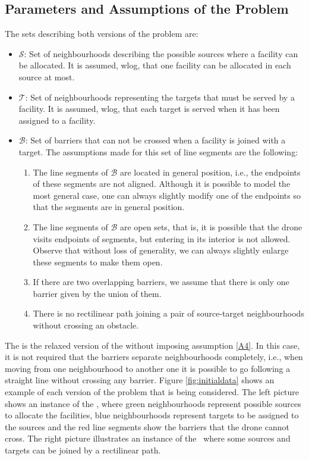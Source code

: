 \documentclass[a4paper,  review, authoryear, 1p.]{elsarticle}
\newcommand{\KMPN}{{\sf{H-KMPN}}}
\newcommand{\KMPVN}{{\sf{H-KMPVN}\xspace }}
\begin{document}
	\subsection{Parameters and Assumptions of the Problem}
	The sets describing both versions of the problem are:
	\begin{itemize}
		\item $\mathcal S$: Set of neighbourhoods describing the possible sources where a facility can be allocated. It is assumed, wlog, that one facility can be allocated in each source at most.
		\item $\mathcal T$: Set of neighbourhoods representing the targets that must be served by a facility. It is assumed, wlog, that each target is served when it has been assigned to a facility.
		\item $\mathcal B$: Set of barriers that can not be crossed when a facility is joined with a target. The assumptions made for this set of line segments are the following:
		
		\begin{enumerate}[label=\textbf{A\arabic*},ref=\textbf{A\arabic*}]
			\item \label{A1}The line segments of $\mathcal B$ are located in general position, i.e., the endpoints of these segments are not aligned. Although it is possible to model the most general case, one can always  slightly modify one of the endpoints so that the segments are in general position.
			\item The line segments of $\mathcal B$ are open sets, that is, it is possible that the drone visits  endpoints of segments, but entering  in its interior is not allowed. Observe that without loss of generality, we can always slightly enlarge these segments to make them open.
			\item  If there are two overlapping barriers, we assume that there is only one barrier given by the union of them.
			\item \label{A4}There is no rectilinear path joining a pair of source-target neighbourhoods without crossing an obstacle.
		\end{enumerate}
		
	\end{itemize}

	The \KMPVN\xspace is the relaxed version of the \KMPN\xspace without imposing assumption \ref{A4}. In this case, it is not required that the barriers separate neighbourhoods completely, i.e., when moving from one neighbourhood to another one it is possible to go following a straight line without crossing any barrier. Figure \ref{fig:initialdata} shows an example of each version of the problem that is being considered. The left picture shows an instance of the \KMPN, where green neighbourhoods represent possible sources to allocate the facilities, blue neighbourhoods represent targets to be assigned to the sources and the red line segments show the barriers that the drone cannot cross. The right picture illustrates an instance of the \KMPVN \ where some sources and targets can be joined by a rectilinear path.
	
\end{document}
